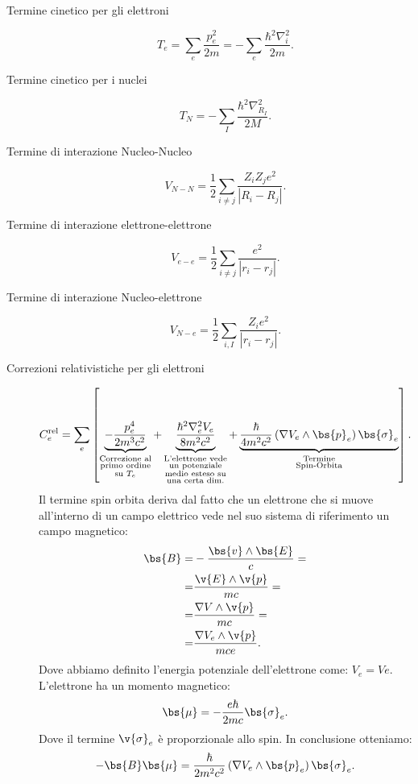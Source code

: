 \begin{description}
	\item[Termine cinetico per gli elettroni] 
		 \[
			T_e = \sum_{e}^{} \frac{p_e^2}{2m} 
			= -\sum_{e}^{} \frac{\hbar ^2 \nabla_i^2}{2m}
		.\] 

	\item[Termine cinetico per i nuclei] 
		\[
			T_N 
			=
			-\sum_{I}^{} \frac{\hbar ^2 \nabla_{R_I}^2}{2M}
		.\] 
	\item[Termine di interazione Nucleo-Nucleo]
		\[
			V_{N-N} = 
			\frac{1}{2}\sum_{i\neq j}^{} 
			\frac{Z_iZ_je^2}{\left| R_i - R_j \right| }
		.\]  
	\item[Termine di interazione elettrone-elettrone]
		\[
			V_{e-e} = 
			\frac{1}{2}\sum_{i\neq j}^{} 
			\frac{e^2}{\left| r_i - r_j \right| }
		.\]
	\item[Termine di interazione Nucleo-elettrone]
		\[
			V_{N-e} = 
			\frac{1}{2}\sum_{i,I}^{} 
			\frac{Z_ie^2}{\left| r_i - r_j \right| }
		.\]
	\item[Correzioni relativistiche per gli elettroni]
		\[
			C_e^{\text{rel}} 
			=
			\sum_{e}^{} \left[ \underbrace{-\frac{p_e^4}{2m^3c^2}}_
			{\substack{\text{Correzione al}\\ 
			\text{primo ordine}\\ 
			\text{su $T_e$}}}
			+ 
			\underbrace{\frac{\hbar ^2 \nabla_e^2 V_e}{8m^2c^2}}_
			{\substack{\text{L'elettrone vede}\\
			\text{un potenziale}\\
			\text{medio esteso su}\\
			\text{una certa dim.}}}
			+
			\underbrace{\frac{\hbar }{4m^2c^2}
			\left( \nabla V_e \wedge\bs{p}_e\right) 
			\bs{\sigma}_e}_
			{\substack{\text{Termine}\\
			\text{Spin-Orbita}}}
			\right] 
		.\] 
		Il termine spin orbita deriva dal fatto che un elettrone che si muove
		all'interno di un campo elettrico vede nel suo sistema di riferimento
		un campo magnetico:
		\[\begin{aligned}
		    \bs{B} =& -\frac{\bs{v}\wedge \bs{E}}{c} =\\
		    	   =& \frac{\v{E}\wedge \v{p}}{mc} =\\
			   =& \frac{\nabla V \wedge \v{p}}{mc} = \\
			   =& \frac{\nabla V_e \wedge \v{p}}{mce}
		.\end{aligned}\]
		Dove abbiamo definito l'energia potenziale dell'elettrone come: $V_e = Ve$.\\
		L'elettrone ha un momento magnetico:
		\[
			\bs{\mu} = - \frac{e\hbar }{2mc} \bs{\sigma}_e
		.\] 
		Dove il termine $\v{\sigma}_e$ è proporzionale allo spin. In conclusione otteniamo:
		\[
			-\bs{B}\bs{\mu} 
			=
			\frac{\hbar}{2m^2c^2}\left( \nabla V_e \wedge \bs{p}_e \right)
			\bs{\sigma}_e
		.\] 
\end{description}
